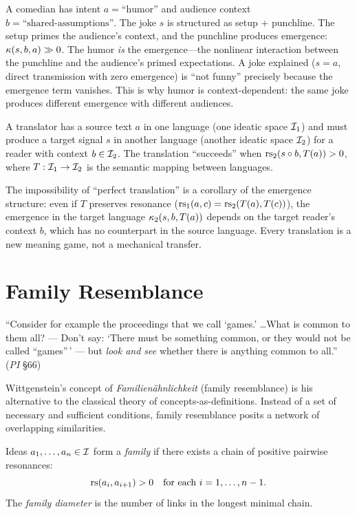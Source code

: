 \begin{example}
A comedian has intent $a = \text{``humor''}$ and audience context
$b = \text{``shared-assumptions''}$. The joke $s$ is structured as
setup + punchline. The setup primes the audience's context, and the
punchline produces emergence: $\kappa(s, b, a) \gg 0$. The humor
\emph{is} the emergence---the nonlinear interaction between the
punchline and the audience's primed expectations. A joke explained
($s = a$, direct transmission with zero emergence) is ``not funny''
precisely because the emergence term vanishes. This is why humor is
context-dependent: the same joke produces different emergence with
different audiences.
\end{example}

\begin{game}
A translator has a source text $a$ in one language (one ideatic space
$\mathcal{I}_1$) and must produce a target signal $s$ in another language
(another ideatic space $\mathcal{I}_2$) for a reader with context $b \in \mathcal{I}_2$.
The translation ``succeeds'' when $\mathrm{rs}_2(s \circ b, T(a)) > 0$,
where $T : \mathcal{I}_1 \to \mathcal{I}_2$ is the semantic mapping between languages.

The impossibility of ``perfect translation'' is a corollary of the
emergence structure: even if $T$ preserves resonance ($\mathrm{rs}_1(a, c)
= \mathrm{rs}_2(T(a), T(c))$), the emergence in the target language
$\kappa_2(s, b, T(a))$ depends on the target reader's context $b$,
which has no counterpart in the source language. Every translation is a
new meaning game, not a mechanical transfer.
\end{game}


\section{Family Resemblance}

``Consider for example the proceedings that we call `games.' \ldots What is
common to them all? --- Don't say: `There must be something common, or they
would not be called ``games''\,' --- but \emph{look and see} whether there
is anything common to all.'' (\emph{PI} \S66)

Wittgenstein's concept of \emph{Familien\"ahnlichkeit} (family resemblance)
is his alternative to the classical theory of concepts-as-definitions. Instead
of a set of necessary and sufficient conditions, family resemblance posits a
network of overlapping similarities.

\begin{definition}
\label{def:family-resemblance}
Ideas $a_1, \ldots, a_n \in \mathcal{I}$ form a \emph{family} if there exists a
chain of positive pairwise resonances:
\[
\mathrm{rs}(a_i, a_{i+1}) > 0 \quad \text{for each } i = 1, \ldots, n-1.
\]
The \emph{family diameter} is the number of links in the longest
minimal chain.
\end{definition}

